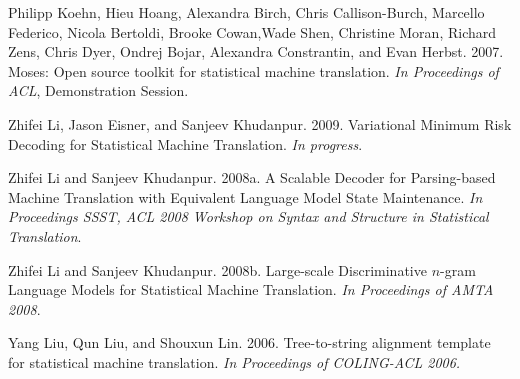\documentclass[11pt]{article}
\begin{document}
\begin{thebibliography}{}

%


Philipp Koehn, Hieu Hoang, Alexandra Birch, Chris
Callison-Burch, Marcello Federico, Nicola Bertoldi,
Brooke Cowan,Wade Shen, Christine Moran, Richard
Zens, Chris Dyer, Ondrej Bojar, Alexandra Constrantin,
and Evan Herbst. 2007. Moses: Open source
toolkit for statistical machine translation. \emph{In Proceedings
of ACL}, Demonstration Session.


Zhifei Li, Jason Eisner, and Sanjeev Khudanpur. 2009.
Variational Minimum Risk Decoding for Statistical Machine Translation.
\emph{In progress}.

Zhifei Li and Sanjeev Khudanpur. 2008a.
A Scalable Decoder for Parsing-based Machine Translation with Equivalent Language Model State Maintenance.
\emph{In Proceedings SSST, ACL 2008 Workshop on Syntax and Structure in Statistical Translation}.

Zhifei Li and Sanjeev Khudanpur. 2008b.
Large-scale Discriminative $n$-gram Language Models for Statistical Machine Translation.
\emph{In Proceedings of AMTA 2008}.

Yang Liu, Qun Liu, and Shouxun Lin. 2006. Tree-to-string
alignment template for statistical machine translation.
\emph{In Proceedings of COLING-ACL 2006.}


\end{thebibliography}
\end{document}
